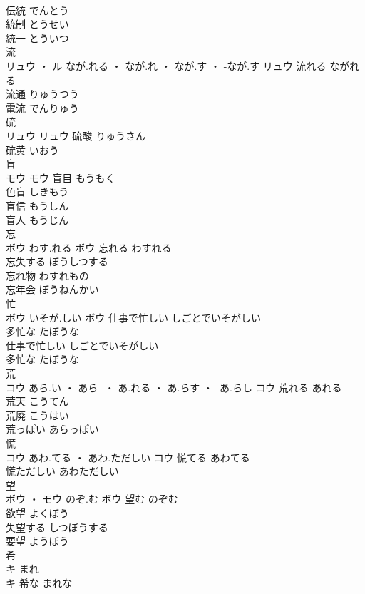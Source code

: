 \documentclass[8pt]{extreport}
\begin{document}
\begin{CJK}{UTF8}{min}
\\	伝統	でんとう	
\\	統制	とうせい	
\\	統一	とういつ	
\\	流	
\\	リュウ ・ ル	なが.れる ・ なが.れ ・ なが.す ・ -なが.す	リュウ	流れる	ながれる	
\\	流通	りゅうつう	
\\	電流	でんりゅう	
\\	硫	
\\	リュウ		リュウ	硫酸	りゅうさん	
\\	硫黄	いおう	
\\	盲	
\\	モウ		モウ	盲目	もうもく	
\\	色盲	しきもう	
\\	盲信	もうしん	
\\	盲人	もうじん	
\\	忘	
\\	ボウ	わす.れる	ボウ	忘れる	わすれる	
\\	忘失する	ぼうしつする	
\\	忘れ物	わすれもの	
\\	忘年会	ぼうねんかい	
\\	忙	
\\	ボウ	いそが.しい	ボウ	仕事で忙しい	しごとでいそがしい	
\\	多忙な	たぼうな	
\\	仕事で忙しい	しごとでいそがしい	
\\	多忙な	たぼうな	
\\	荒	
\\	コウ	あら.い ・ あら- ・ あ.れる ・ あ.らす ・ -あ.らし	コウ	荒れる	あれる	
\\	荒天	こうてん	
\\	荒廃	こうはい	
\\	荒っぽい	あらっぽい	
\\	慌	
\\	コウ	あわ.てる ・ あわ.ただしい	コウ	慌てる	あわてる	
\\	慌ただしい	あわただしい	
\\	望	
\\	ボウ ・ モウ	のぞ.む	ボウ	望む	のぞむ	
\\	欲望	よくぼう	
\\	失望する	しつぼうする	
\\	要望	ようぼう	
\\	希	
\\	キ	まれ
\\	キ	希な	まれな	

\end{CJK}
\end{document}
